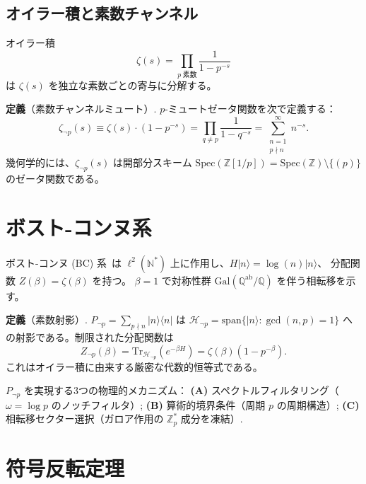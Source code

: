 \documentclass[11pt,a4paper]{article}
\newcommand{\Spec}{\mathrm{Spec}}
\newcommand{\Tr}{\mathrm{Tr}}
\newcommand{\Gal}{\mathrm{Gal}}
\newcommand{\Zp}{\mathbb{Z}[1/p]}
\begin{document}
\subsection{オイラー積と素数チャンネル}

オイラー積
\begin{equation}
  \zeta(s) = \prod_{p\;\text{素数}} \frac{1}{1 - p^{-s}}
  \label{eq:euler}
\end{equation}
は $\zeta(s)$ を独立な素数ごとの寄与に分解する。

\noindent\textbf{定義}（素数チャンネルミュート）.
$p$-ミュートゼータ関数を次で定義する：
\begin{equation}
  \zeta_{\neg p}(s) \equiv \zeta(s)\cdot(1 - p^{-s})
  = \prod_{q \neq p} \frac{1}{1 - q^{-s}}
  = \sum_{\substack{n=1\\p\nmid n}}^{\infty} n^{-s}.
  \label{eq:muted}
\end{equation}
幾何学的には、$\zeta_{\neg p}(s)$ は開部分スキーム
$\Spec(\Zp) = \Spec(\mathbb{Z})\setminus\{(p)\}$ のゼータ関数である。

\section{ボスト-コンヌ系}

ボスト-コンヌ (BC) 系~\cite{BostConnes1995,ConnesMarcolli2006}は
$\ell^2(\mathbb{N}^*)$ 上に作用し、$H|n\rangle = \log(n)|n\rangle$、
分配関数 $Z(\beta) = \zeta(\beta)$ を持つ。
$\beta = 1$ で対称性群
$\Gal(\mathbb{Q}^{\mathrm{ab}}/\mathbb{Q})$
を伴う相転移を示す。

\noindent\textbf{定義}（素数射影）.
$P_{\neg p} = \sum_{p\nmid n} |n\rangle\langle n|$ は
$\mathcal{H}_{\neg p} = \mathrm{span}\{|n\rangle : \gcd(n,p) = 1\}$
への射影である。制限された分配関数は
\begin{equation}
  Z_{\neg p}(\beta) = \Tr_{\mathcal{H}_{\neg p}}(e^{-\beta H})
  = \zeta(\beta)(1 - p^{-\beta}).
\end{equation}
これはオイラー積に由来する厳密な代数的恒等式である。

$P_{\neg p}$ を実現する3つの物理的メカニズム：
\textbf{(A)} スペクトルフィルタリング（$\omega = \log p$ のノッチフィルタ）;
\textbf{(B)} 算術的境界条件（周期 $p$ の周期構造）;
\textbf{(C)} 相転移セクター選択（ガロア作用の $\mathbb{Z}_p^*$ 成分を凍結）.

\section{符号反転定理}
\end{document}
